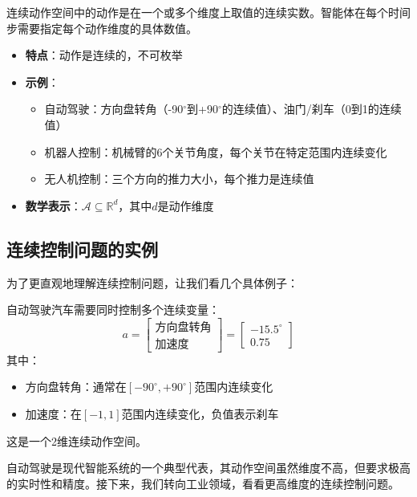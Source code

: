 \documentclass[lang=cn,zihao=-4,a4paper,fontset=windows]{beautybook}
\begin{document}
\begin{definition}
连续动作空间中的动作是在一个或多个维度上取值的连续实数。智能体在每个时间步需要指定每个动作维度的具体数值。
\begin{itemize}
\item \textbf{特点}：动作是连续的，不可枚举
\item \textbf{示例}：
\begin{itemize}
\item 自动驾驶：方向盘转角（-90$^\circ$到+90$^\circ$的连续值）、油门/刹车（0到1的连续值）
\item 机器人控制：机械臂的6个关节角度，每个关节在特定范围内连续变化
\item 无人机控制：三个方向的推力大小，每个推力是连续值
\end{itemize}
\item \textbf{数学表示}：$\mathcal{A} \subseteq \mathbb{R}^d$，其中$d$是动作维度
\end{itemize}
\end{definition}

\subsection{连续控制问题的实例}

为了更直观地理解连续控制问题，让我们看几个具体例子：
\begin{example}[][自动驾驶]
自动驾驶汽车需要同时控制多个连续变量：
\[
a = \begin{bmatrix}
\text{方向盘转角} \\ \text{加速度}
\end{bmatrix} = \begin{bmatrix}
-15.5^\circ \\ 0.75
\end{bmatrix}
\]
其中：
\begin{itemize}
    \item 方向盘转角：通常在$[-90^\circ, +90^\circ]$范围内连续变化
    \item 加速度：在$[-1, 1]$范围内连续变化，负值表示刹车
\end{itemize}
这是一个2维连续动作空间。
\end{example}

自动驾驶是现代智能系统的一个典型代表，其动作空间虽然维度不高，但要求极高的实时性和精度。接下来，我们转向工业领域，看看更高维度的连续控制问题。
\end{document}
